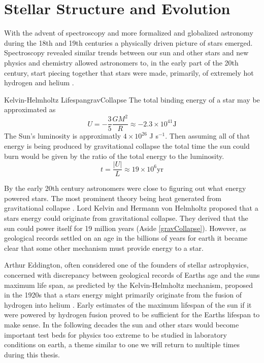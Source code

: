 \chapter{Stellar Structure and Evolution}
With the advent of spectroscopy and more formalized and globalized astronomy
during the 18th and 19th centuries a physically driven picture of stars emerged.
Spectroscopy revealed similar trends between our sun and other stars and new
physics and chemistry allowed astronomers to, in the early part of the 20th century, start piecing together that stars
were made, primarily, of extremely hot hydrogen and helium \citep{Payne1925}.

\begin{sidebar}{Kelvin-Helmholtz Lifespan}{gravCollapse}
  The total binding energy of a star may be approximated as
  \begin{equation*}
    U = -\frac{3}{5}\frac{GM^{2}}{R} \approx -2.3 \times 10^{41} \text{J}
  \end{equation*}
  The Sun's luminosity is approximatly $4\times 10^{26}$ J s$^{-1}$. Then
  assuming all of that energy is being produced by gravitational collapse the
  total time the sun could burn would be given by the ratio of the total energy
  to the luminosity.
  \begin{equation*}
    t = \frac{|U|}{L} \approx 19 \times 10^{6} \text{yr}
  \end{equation*}
\end{sidebar}

By the early 20th century astronomers were close to figuring out what energy
powered stars. The most prominent theory being heat generated from
gravitational collapse \citep[which had initially been proposed as a theory of
stellar system, but not energy generation by Kant and Laplace,][]{Kalita2023}.
Lord Kelvin and Hermann von Helmholtz proposed that a stars energy could
originate from gravitational collapse. They derived that the sun could power
itself for 19 million years \addcite (Aside \ref{gravCollapse}). However, as
geological records settled on an age in the billions of years for earth it
became clear that some other mechanism must provide energy to a star.

Arthur Eddington, often considered one of the founders of stellar astrophysics,
concerned with discrepancy between geological records of Earths age and the
suns maximum life span, as predicted by the Kelvin-Helmholtz mechanism,
proposed in the 1920s that a stars energy might primarily originate from the
fusion of hydrogen into helium \addcite. Early estimates of the maximum
lifespan of the sun if it were powered by hydrogen fusion proved to be
sufficient for the Earths lifespan to make sense. In the following decades the
sun and other stars would become important test beds for physics too extreme to
be studied in laboratory conditions on earth, a theme similar to one we will
return to multiple times during this thesis.

